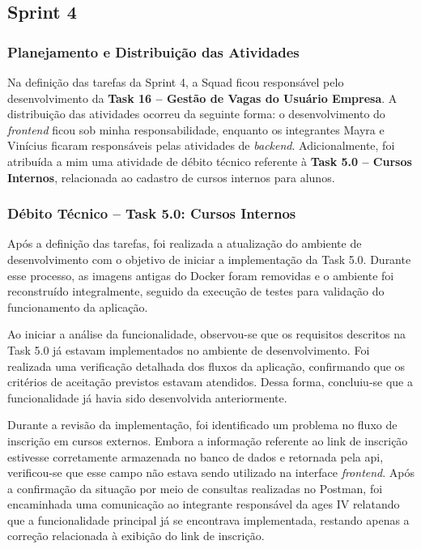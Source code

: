 \subsection{Sprint 4}

\subsubsection*{Planejamento e Distribuição das Atividades}

Na definição das tarefas da Sprint 4, a Squad ficou responsável pelo desenvolvimento
da \textbf{Task 16 -- Gestão de Vagas do Usuário Empresa}. A distribuição das
atividades ocorreu da seguinte forma: o desenvolvimento do \textit{frontend} ficou
sob minha responsabilidade, enquanto os integrantes Mayra e Vinícius ficaram
responsáveis pelas atividades de \textit{backend}. Adicionalmente, foi atribuída a
mim uma atividade de débito técnico referente à \textbf{Task 5.0 -- Cursos Internos},
relacionada ao cadastro de cursos internos para alunos.

\subsubsection*{Débito Técnico -- Task 5.0: Cursos Internos}

Após a definição das tarefas, foi realizada a atualização do ambiente de
desenvolvimento com o objetivo de iniciar a implementação da Task 5.0. Durante esse
processo, as imagens antigas do Docker foram removidas e o ambiente foi reconstruído
integralmente, seguido da execução de testes para validação do funcionamento da
aplicação.

Ao iniciar a análise da funcionalidade, observou-se que os requisitos descritos na
Task 5.0 já estavam implementados no ambiente de desenvolvimento. Foi realizada uma
verificação detalhada dos fluxos da aplicação, confirmando que os critérios de
aceitação previstos estavam atendidos. Dessa forma, concluiu-se que a funcionalidade
já havia sido desenvolvida anteriormente.

Durante a revisão da implementação, foi identificado um problema no fluxo de inscrição
em cursos externos. Embora a informação referente ao link de inscrição estivesse
corretamente armazenada no banco de dados e retornada pela \ac{api}, verificou-se que
esse campo não estava sendo utilizado na interface \textit{frontend}. Após a
confirmação da situação por meio de consultas realizadas no Postman, foi encaminhada
uma comunicação ao integrante responsável da \ac{ages} IV relatando que a
funcionalidade principal já se encontrava implementada, restando apenas a correção
relacionada à exibição do link de inscrição.

